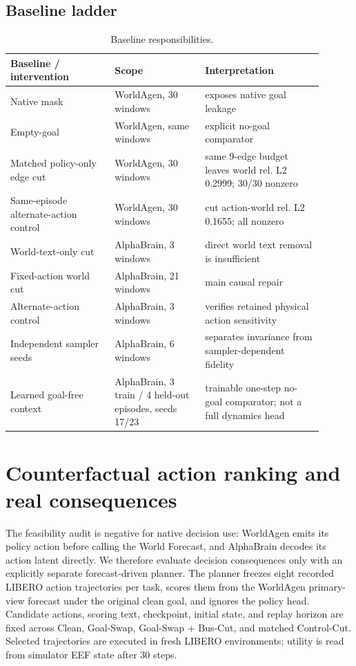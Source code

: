 \documentclass[10pt]{article}
\begin{document}
\subsection{Baseline ladder}
\begin{table}[h]
\centering\small
\caption{Baseline responsibilities.}
\begin{tabular}{p{0.30\linewidth}p{0.26\linewidth}p{0.34\linewidth}}
\toprule
Baseline / intervention & Scope & Interpretation \\
\midrule
Native mask & WorldAgen, 30 windows & exposes native goal leakage \\
Empty-goal & WorldAgen, same windows & explicit no-goal comparator \\
Matched policy-only edge cut & WorldAgen, 30 windows & same 9-edge budget leaves world rel. L2 0.2999; 30/30 nonzero \\
Same-episode alternate-action control & WorldAgen, 30 windows & cut action-world rel. L2 0.1655; all nonzero \\
World-text-only cut & AlphaBrain, 3 windows & direct world text removal is insufficient \\
Fixed-action world cut & AlphaBrain, 21 windows & main causal repair \\
Alternate-action control & AlphaBrain, 3 windows & verifies retained physical action sensitivity \\
Independent sampler seeds & AlphaBrain, 6 windows & separates invariance from sampler-dependent fidelity \\
Learned goal-free context & AlphaBrain, 3 train / 4 held-out episodes, seeds 17/23 & trainable one-step no-goal comparator; not a full dynamics head \\
\bottomrule
\end{tabular}
\end{table}

\section{Counterfactual action ranking and real consequences}
The feasibility audit is negative for native decision use: WorldAgen emits its policy action before calling the World Forecast, and AlphaBrain decodes its action latent directly. We therefore evaluate decision consequences only with an explicitly separate forecast-driven planner. The planner freezes eight recorded LIBERO action trajectories per task, scores them from the WorldAgen primary-view forecast under the original clean goal, and ignores the policy head. Candidate actions, scoring text, checkpoint, initial state, and replay horizon are fixed across Clean, Goal-Swap, Goal-Swap + Bus-Cut, and matched Control-Cut. Selected trajectories are executed in fresh LIBERO environments; utility is read from simulator EEF state after 30 steps.
\end{document}

